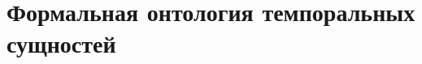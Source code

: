 \begin{comment}
\begin{SCn}
\scnheader{возведение в степень*}
\scniselement{арифметическая операция}
\scniselement{бинарное отношение}
\end{SCn}

\textbf{\textit{возведение в степень*}} --- это \textit{арифметическая операция}, в результате которой число, называемое основанием степени, умножается само на себя столько раз, каков показатель степени.
	
Первым компонентом связки отношения \textit{возведение в степень*} является ориентированная пара, первым компонентом которой является \textit{число}, которое является основанием степени, вторым --- \textit{число}, которое является показателем степени; Вторым компонентом связки отношения \textit{возведение в степень*} является \textit{число}, которое является результатом возведения в степень.

\begin{SCn}	
\scnheader{больше*}
\scniselement{бинарное отношение}
\scniselement{отношение строгого порядка}
\scnexplanation{\textbf{\textit{больше*}} --- это \textit{бинарное отношение} сравнения чисел. Из двух чисел на координатной прямой больше то, которое расположено правее. Соответственно, первым компонентом связки \textit{отношения} \textit{больше*} является большее из двух \textit{чисел}.}
\end{SCn}
\end{comment}

\section{Формальная онтология темпоральных сущностей}
\label{sec_top_ontologies_temp}
		
